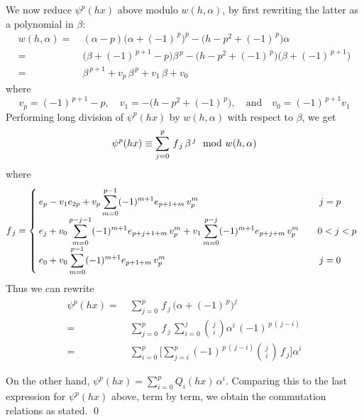 \documentclass{gtpart}
\theoremstyle{definition}
\theoremstyle{remark}
\newcommand{\md}{~~{\rm mod}~}
\newcommand{\ad}{\text{and}}
\newcommand{\A}{\alpha}
\newcommand{\B}{\beta}
\renewcommand{\=}{\approx}
\renewcommand{\-}{\sim}
\newcommand{\ch}[2]{{#1 \choose #2}}
\numberwithin{equation}{section}
\begin{document}
We now reduce $\psi^p(h x)$ above modulo $w(h,\A)$, by first rewriting the 
latter as a polynomial in $\B$: 
\[
 \begin{split}
  w(h,\A) = & ~ (\A - p) \big(\A + (-1)^{\,p}\big)^p 
              - \big(h - p^2 + (-1)^{\,p}\big) \A \\
          = & ~ \big(\B + (-1)^{\,p + 1} - p\big) \B^{\,p} 
              - \big(h - p^2 + (-1)^{\,p}\big) \big(\B + (-1)^{\,p + 1}\big) \\
          = & ~ \B^{\,p + 1} + v_p \, \B^{\,p} + v_1 \, \B + v_0 
 \end{split}
\]
where 
\[
 v_p = (-1)^{\,p + 1} - p, \quad v_1 = -\big(h - p^2 + (-1)^{\,p}\big), 
 \quad \ad \quad v_0 = (-1)^{\,p + 1} v_1 
\]
Performing long division of $\psi^p(h x)$ by $w(h,\A)$ with respect to $\B$, we 
get 
\[
 \psi^p(h x) \equiv \sum_{j = 0}^p \, f_{\,j} \, \B^{\,j} \md w(h,\A) 
\]
where 
\[
 f_{\,j} = \left\{ \hskip -.1cm
  \begin{array}{lll}
   \displaystyle e_p - v_1 e_{2 p} + v_p \sum_{m = 0}^{p - 1} (-1)^{m + 1} 
                 e_{p + 1 + m} \, v_p^m              && \,j = p \\
   \displaystyle e_j + v_0 \sum_{m = 0}^{p - j - 1} (-1)^{m + 1} 
                 e_{p + j + 1 + m} \, v_p^m + v_1 \sum_{m = 0}^{p - j} 
                 (-1)^{m + 1} e_{p + j + m} \, v_p^m && 0 < j < p \\
   \displaystyle e_0 + v_0 \sum_{m = 0}^{p - 1} (-1)^{m + 1} e_{p + 1 + m} \, 
                 v_p^m                               && \,j = 0 
  \end{array}
 \right. 
\]
Thus we can rewrite 
\[
 \begin{split}
  \psi^p(h x) = & ~ \sum_{j = 0}^p \, f_{\,j} \, \big(\A + (-1)^{\,p}\big)^j \\
              = & ~ \sum_{j = 0}^p \, f_{\,j} \, \sum_{i = 0}^j \ch{\,j\,}{i} 
                    \A^i \, (-1)^{\,p \, (\,j - i)} \\
              = & ~ \sum_{i = 0}^p \Bigg[ \sum_{j = i}^p (-1)^{\,p \, (\,j - i)} 
                    \ch{\,j\,}{i} \, f_{\,j} \Bigg] \A^i 
 \end{split}
\]

On the other hand, $\psi^p(h x) = \sum_{i = 0}^p Q_i (h x) \, \A^i$.  Comparing 
this to the last expression for $\psi^p(h x)$ above, term by term, we obtain the 
commutation relations as stated.  \qed



% 
% 
\end{document}
